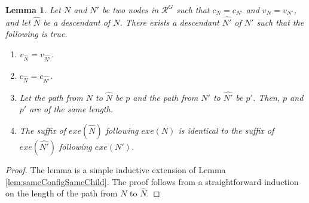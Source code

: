 \documentclass[11pt]{article}
\numberwithin{theorem}{section}
\newtheorem{lemma}[theorem]{Lemma}
\begin{document}
  
 \begin{lemma}\label{lem:sameConfigSameExtensionLength}
 Let $N$ and $N'$ be two nodes in $\mathcal{R}^{G}$ such that $c_N = c_{N'}$ and $v_N = v_{N'}$, and let $\hat{N}$ be a descendant of $N$. There exists a descendant $\widehat{N'}$ of $N'$ such that the following is true.
 \begin{enumerate}
 \item $v_{\hat{N}} = v_{\widehat{N'}}$.
 \item $c_{\hat{N}} = c_{\widehat{N'}}$. 
 \item Let the path from $N$ to $\hat{N}$ be $p$ and the path from $N'$ to $\widehat{N'}$ be $p'$. Then, $p$ and $p'$ are of the same length.
\item The suffix of $exe(\hat{N})$ following $exe(N)$ is identical to the suffix of $exe(\widehat{N'})$ following $exe(N')$.
  \end{enumerate}
\end{lemma}
\begin{proof}
The lemma is a simple inductive extension of Lemma \ref{lem:sameConfigSameChild}. The proof follows from a straightforward induction on the length of the path from $N$ to $\hat{N}$.
\end{proof}
\end{document}
